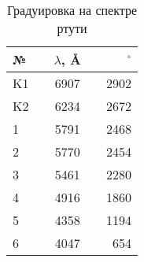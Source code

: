 \begin{table}[h!]
\centering
\caption{Градуировка на спектре ртути}
\label{tab:hg_calibrating}
\begin{tabular}{lcccr}
\toprule
№ & {\hspace{0.8cm}} & $\lambda$, Å & {\hspace{0.8cm}} & $^\circ$ \\
\midrule
K1 & {} & 6907 & {} & 2902 \\
K2 & {} & 6234 & {} & 2672 \\
1  & {} & 5791 & {} & 2468 \\
2  & {} & 5770 & {} & 2454 \\
3  & {} & 5461 & {} & 2280 \\
4  & {} & 4916 & {} & 1860 \\
5  & {} & 4358 & {} & 1194 \\
6  & {} & 4047 & {} &  654 \\
\bottomrule
\end{tabular}
\end{table}
